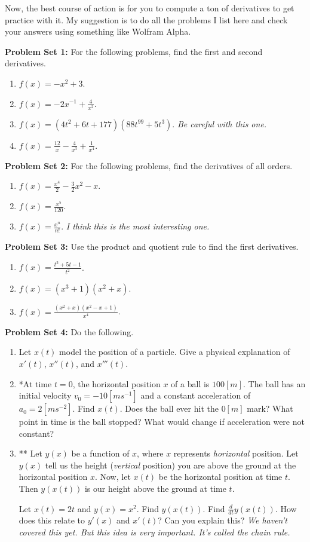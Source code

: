 \documentclass[leqno]{article}
\theoremstyle{definition}
\theoremstyle{remark}
\theoremstyle{theorem}
\begin{document}
Now, the best course of action is for you to compute a ton of derivatives to get practice with it. My suggestion is to do all the problems I list here and check your answers using something like Wolfram Alpha.

\noindent \textbf{Problem Set 1:} For the following problems, find the first and second derivatives.
\begin{enumerate}[1.]
\item $f(x)=-x^2+3$.
\item $f(x)=-2x^{-1}+\frac{4}{x^2}$.
\item $f(x)=(4t^2+6t+177)(88t^99+5t^3)$. \emph{Be careful with this one.}
\item $f(x)=\frac{12}{x}-\frac{4}{x^3}+\frac{1}{x^4}$.
\end{enumerate}
\pagebreak

\noindent \textbf{Problem Set 2:} For the following problems, find the derivatives of all orders.
\begin{enumerate}[1.]
\item $f(x)=\frac{x^4}{2}-\frac{3}{2}x^2-x$.
\item $f(x)=\frac{x^5}{120}$.
\item $f(x)=\frac{x^n}{n!}$. \emph{I think this is the most interesting one.}
\end{enumerate}
\vspace*{8cm}

\noindent \textbf{Problem Set 3:} Use the product and quotient rule to find the first derivatives.
\begin{enumerate}[1.]
\item $f(x)=\frac{t^2+5t-1}{t^2}$.
\item $f(x)=(x^3+1)(x^2+x)$.
\item $f(x)=\frac{(x^2+x)(x^2-x+1)}{x^4}$.
\end{enumerate}
\pagebreak

\noindent \textbf{Problem Set 4:} Do the following.
\begin{enumerate}[1.]
\item Let $x(t)$ model the position of a particle.  Give a physical explanation of $x'(t)$, $x''(t)$, and $x'''(t)$.
\item *At time $t=0$, the horizontal position $x$ of a ball is $100[m]$.  The ball has an initial velocity $v_0=-10[ms^{-1}]$ and a constant acceleration of $a_0=2[ms^{-2}]$.  Find $x(t)$. Does the ball ever hit the $0[m]$ mark? What point in time is the ball stopped? What would change if acceleration were not constant?
\item ** Let $y(x)$ be a function of $x$, where $x$ represents \emph{horizontal} position. Let $y(x)$ tell us the height (\emph{vertical} position) you are above the ground at the horizontal position $x$. Now, let $x(t)$ be the horizontal position at time $t$.  Then $y(x(t))$ is our height above the ground at time $t$.  

Let $x(t)=2t$ and $y(x)=x^2$.  Find $y(x(t))$. Find $\frac{d}{dt}y(x(t))$.  How does this relate to $y'(x)$ and $x'(t)$? Can you explain this? \emph{We haven't covered this yet.  But this idea is very important.  It's called the chain rule.}
\end{enumerate}
\end{document}
